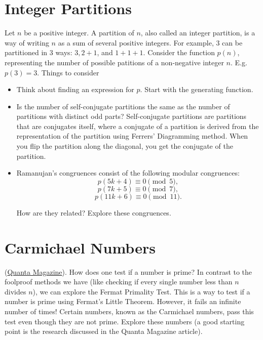 \documentclass{article}
\begin{document}
\section{Integer Partitions}

    Let $n$ be a positive integer. A partition of $n$, also called an integer partition, is a way of writing $n$ as a sum of several positive integers. For example, $3$ can be partitioned in 3 ways: $3, 2 + 1$, and $1 + 1 + 1.$ Consider the function $p(n)$, representing the number of possible patitions of a non-negative integer $n$. E.g. $p(3) = 3.$ Things to consider
    \begin{itemize}
        \item Think about finding an expression for $p$. Start with the generating function.
        \item Is the number of self-conjugate partitions the same as the number of partitions with distinct odd parts? Self-conjugate partitions are partitions that are conjugates itself, where a conjugate of a partition is derived from the representation of the partition using Ferrers' Diagramming method. When you flip the partition along the diagonal, you get the conjugate of the partition.
        \item Ramanujan's congruences consist of the following modular congruences:
        $$p(5k + 4) \equiv 0 \pmod{5},$$
        $$p(7k + 5) \equiv 0\pmod{7},$$
        $$p(11k + 6) \equiv 0 \pmod{11}.$$

        How are they related? Explore these congruences.
    \end{itemize}

\pagebreak

\section{ Carmichael Numbers} (\hyperlink{https://www.quantamagazine.org/teenager-solves-stubborn-riddle-about-prime-number-look-alikes-20221013/}{Quanta Magazine}). How does one test if a number is prime? In contrast to the foolproof methods we have (like checking if every single number less than $n$ divides $n$), we can explore the Fermat Primality Test. This is a way to test if a number is prime using Fermat's Little Theorem. However, it fails an infinite number of times! Certain numbers, known as the Carmichael numbers, pass this test even though they are not prime. Explore these numbers (a good starting point is the research discussed in the Quanta Magazine article).
        
\end{document}
